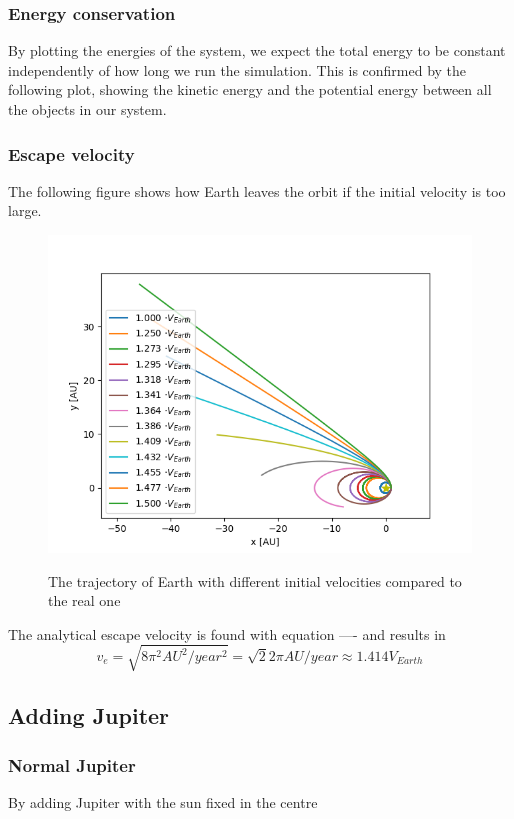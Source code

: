 \documentclass[10pt]{article}
\begin{document}
\begin{multicols}{2}
\subsubsection{Energy conservation}
By plotting the energies of the system, we expect the total energy to be
constant independently of how long we run the simulation. This is confirmed
by the following plot, showing the kinetic energy and the potential energy
between all the objects in our system.

\subsubsection{Escape velocity}
The following figure
shows how Earth leaves the orbit if the initial velocity is too large.
\begin{figure}[H]
    \centering
    \includegraphics[width=1.0\linewidth]{../results/Esacpe_vel.png}
    \label{fig:name}
    \caption{The trajectory of Earth with different initial velocities compared to the real one}
\end{figure}
The analytical escape velocity is found with equation ---- and results in
\begin{equation}
    v_{e} = \sqrt{8\pi^2 AU^2/year^2} = \sqrt{2}2\pi AU/year \approx 1.414V_{Earth}\nonumber
\end{equation}


\subsection{Adding Jupiter}
\subsubsection{Normal Jupiter}
By adding Jupiter with the sun fixed in the centre 

\end{multicols}
\end{document}
